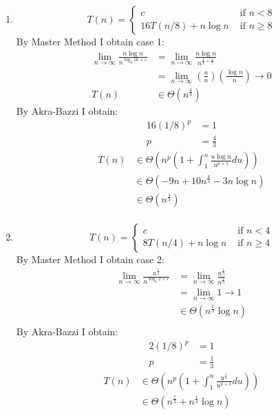 \documentclass[paper=a4,fontsize=11pt]{article}
\begin{document}
\begin{enumerate}
\item
\[
T(n) = \left\{
\begin{array}{cl}
c & \textrm{ if } n < 8\\
16T(n/8) + n\log{n} & \textrm{ if } n \geq 8
\end{array}
\right.
\]
By Master Method I obtain case 1:
\begin{align*}
\lim_{n\to\infty}{\frac{n\log{n}}{n^{\log_{8}{16}+\varepsilon}}}&=\lim_{n\to\infty}{\frac{n\log{n}}{n^{\frac{4}{3}+\frac{2}{3}}}}\\
&=\lim_{n\to\infty}{(\frac{n}{n})(\frac{\log{n}}{n})}\rightarrow0\\
T(n)&\in\Theta(n^{\frac{4}{3}})
\end{align*}
By Akra-Bazzi I obtain:\\
\begin{align*}
16(1/8)^{p}&=1\\
p&=\frac{4}{3}
\end{align*}
\begin{align*}
T(n) &\in \Theta(n^{p}(1+\int_{1}^{n}{\frac{u\log{u}}{u^{p+1}}du}))\\
&\in \Theta(-9n+10n^{\frac{4}{3}}-3n\log{n})\\
&\in \Theta(n^{\frac{4}{3}})\\
\end{align*}
\item
\[
T(n) = \left\{
\begin{array}{cl}
c & \textrm{ if } n < 4\\
8T(n/4) + n\log n & \textrm{ if } n \geq 4
\end{array}
\right.
\]
By Master Method I obtain case 2:
\begin{align*}
    \lim_{n\to\infty}{\frac{n^{\frac{1}{3}}}{n^{\log_{8}{2}+\varepsilon}}}&=\lim_{n\to\infty}{\frac{n^{\frac{1}{3}}}{n^{\frac{1}{3}}}}\\
    &=\lim_{n\to\infty}{1}\rightarrow1\\
    &\in \Theta(n^{\frac{1}{3}}\log{n})\\
\end{align*}
By Akra-Bazzi I obtain:
\begin{align*}
    2(1/8)^{p}&=1\\
    p&=\frac{1}{3}
\end{align*}
\begin{align*}
    T(n) &\in \Theta(n^{p}(1+\int_{1}^{n}{\frac{u^{\frac{1}{3}}}{u^{p+1}}du}))\\
    &\in \Theta(n^{\frac{1}{3}}+n^{\frac{1}{3}}\log{n})\\

\end{align*}
\end{enumerate}
\end{document}
